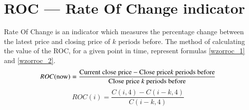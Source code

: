 \section{ROC --- Rate Of Change indicator}
\label{sec:1ROC}
Rate Of Change is an indicator which measures the percentage change between the latest price and closing price of $k$ periods before. The method of calculating the value of the ROC, for a given point in time, represent formulas \ref{wzorroc_1} and \ref{wzorroc_2}.
\begin{equation}
ROC(\text{now}) = \frac{\text{Current close price} - \text{Close price} k \text{ periods before}}{\text{Close price } k \text{ periods before}}\\
\label{wzorroc_1}
\end{equation}
\begin{equation}
ROC(i) = \frac{C(i,4) - C(i-k,4)}{C(i-k,4)}
\label{wzorroc_2}
\end{equation}


